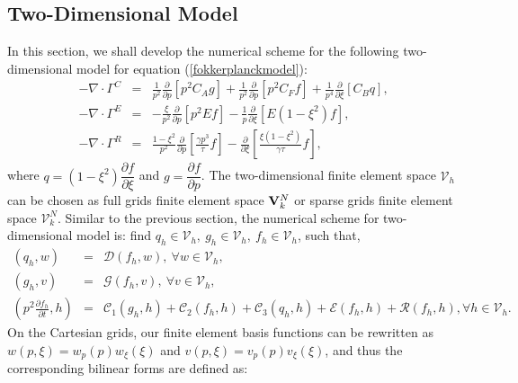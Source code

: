 \documentclass[preprint,11pt]{elsarticle}
\begin{document}
\subsection{Two-Dimensional Model}\label{subsect:2D-scheme}
In this section, we shall develop the numerical scheme for the following two-dimensional model for equation (\ref{fokkerplanckmodel}):
\begin{eqnarray}
-\nabla\cdot\Gamma^C &=& \frac{1}{p^2}\frac{\partial}{\partial p}[p^2C_Ag]  +\frac{1}{p^2}\frac{\partial}{\partial p}[p^2C_Ff]+\frac{1}{p^4}\frac{\partial}{\partial\xi}[C_Bq],\label{eq:2DModel-1}\\ 
-\nabla\cdot\Gamma^E &=&
-\frac{\xi}{p^2}\frac{\partial}{\partial p}[p^2Ef]-\frac{1}{p}\frac{\partial}{\partial\xi}[E(1-\xi^2)f],\label{eq:2DModel-2}\\
-\nabla\cdot\Gamma^R&=&\frac{1-\xi^2}{p^2}\frac{\partial}{\partial p}[\frac{\gamma p^3}{\tau}f ]-\frac{\partial}{\partial\xi}[\frac{\xi(1-\xi^2)}{\gamma\tau}f],\label{eq:2DModel-3}
\end{eqnarray}
where $q = (1-\xi^2)\dfrac{\partial f}{\partial\xi}$ and $g = \dfrac{\partial f}{\partial p}$. The two-dimensional finite element space $\mathcal{V}_h$ can be chosen as full grids finite element space ${\bf V}_k^N$ or sparse grids finite element space $\mathcal{V}_k^N.$ Similar to the previous section, the numerical scheme for two-dimensional model is: find $q_h\in\mathcal{V}_h,\ g_h\in\mathcal{V}_h,\ f_h\in\mathcal{V}_h$, such that,
\begin{eqnarray*}
(q_h,w) &=& \mathcal{D}(f_h,w),\ \forall w\in \mathcal{V}_h, \\
(g_h,v) &=& \mathcal{G}(f_h,v),\ \forall v\in \mathcal{V}_h,\\
(p^2\frac{\partial f_h}{\partial t},h) &=& \mathcal{C}_1(g_h,h)+\mathcal{C}_2(f_h,h)+\mathcal{C}_3(q_h,h)+\mathcal{E}(f_h,h)+\mathcal{R}(f_h,h), \forall h\in \mathcal{V}_h.
\end{eqnarray*}
On the Cartesian grids, our finite element basis  functions can be rewritten as $w(p,\xi) = w_p(p)w_{\xi}(\xi)$ and $v(p,\xi) = v_p(p)v_{\xi}(\xi)$, and thus the corresponding bilinear forms are defined as:
\end{document}
